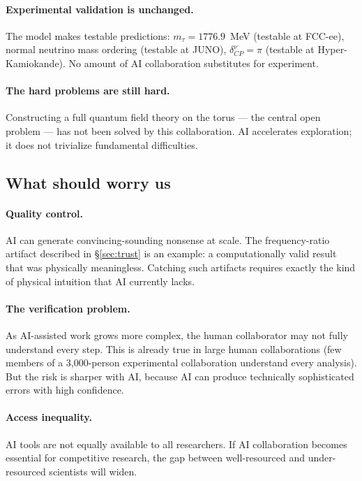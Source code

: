 \documentclass[11pt,a4paper]{article}
\begin{document}
\paragraph{Experimental validation is unchanged.}
The model makes testable predictions: $m_\tau = 1776.9$~MeV (testable at FCC-ee), normal neutrino mass ordering (testable at JUNO), $\delta_{CP}^\nu = \pi$ (testable at Hyper-Kamiokande). No amount of AI collaboration substitutes for experiment.

\paragraph{The hard problems are still hard.}
Constructing a full quantum field theory on the torus --- the central open problem --- has not been solved by this collaboration. AI accelerates exploration; it does not trivialize fundamental difficulties.

\subsection{What should worry us}

\paragraph{Quality control.}
AI can generate convincing-sounding nonsense at scale. The frequency-ratio artifact described in \S\ref{sec:trust} is an example: a computationally valid result that was physically meaningless. Catching such artifacts requires exactly the kind of physical intuition that AI currently lacks.

\paragraph{The verification problem.}
As AI-assisted work grows more complex, the human collaborator may not fully understand every step. This is already true in large human collaborations (few members of a 3,000-person experimental collaboration understand every analysis). But the risk is sharper with AI, because AI can produce technically sophisticated errors with high confidence.

\paragraph{Access inequality.}
AI tools are not equally available to all researchers. If AI collaboration becomes essential for competitive research, the gap between well-resourced and under-resourced scientists will widen.
\end{document}
